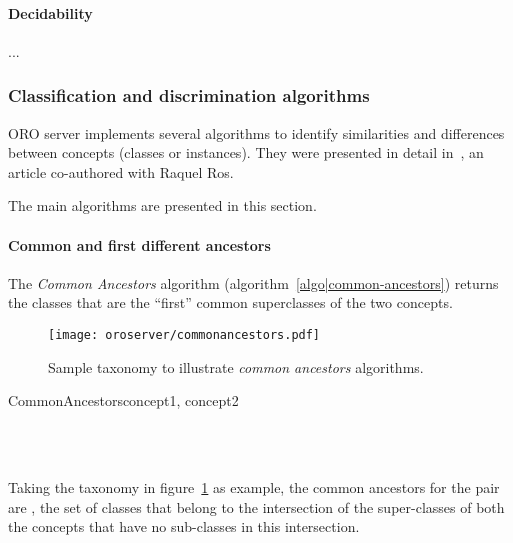 \paragraph{Decidability}

...

\subsubsection{Classification and discrimination algorithms}
\label{sect|discrimination}

ORO server implements several algorithms to identify similarities and
differences between concepts (classes or instances). They were presented in
detail in~\cite{Ros2010b}, an article co-authored with Raquel Ros.

The main algorithms are presented in this section.

\paragraph{Common and first different ancestors} The \emph{Common Ancestors}
algorithm (algorithm~\ref{algo|common-ancestors}) returns the classes that
are the ``first'' common superclasses of the two concepts.

\begin{figure}
    \centering
    \texttt{[image: oroserver/commonancestors.pdf]}
    \caption{Sample taxonomy to illustrate \emph{common ancestors} algorithms.}
    \label{fig|common-ancestors}
\end{figure}

\small
\begin{pseudocode}[ruled]{CommonAncestors}{concept1, concept2}
\label{algo|common-ancestors}

\BEGIN
{} \GETS {} \cap {} \\
\\
\END

\end{pseudocode}
\normalsize

Taking the taxonomy in figure~\ref{fig|common-ancestors} as example, the common
ancestors for the pair  are
, \ie the set of classes that belong to
the intersection of the super-classes of both the concepts that have no
sub-classes in this intersection.

